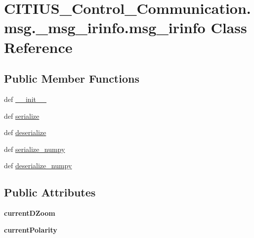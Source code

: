 \hypertarget{class_c_i_t_i_u_s___control___communication_1_1msg_1_1__msg__irinfo_1_1msg__irinfo}{\section{\-C\-I\-T\-I\-U\-S\-\_\-\-Control\-\_\-\-Communication.\-msg.\-\_\-msg\-\_\-irinfo.\-msg\-\_\-irinfo \-Class \-Reference}
\label{class_c_i_t_i_u_s___control___communication_1_1msg_1_1__msg__irinfo_1_1msg__irinfo}
}
\subsection*{\-Public \-Member \-Functions}
\begin{DoxyCompactItemize}
\item 
def \hyperlink{class_c_i_t_i_u_s___control___communication_1_1msg_1_1__msg__irinfo_1_1msg__irinfo_af01b0eb12fb7286506f283522351d9ca}{\-\_\-\-\_\-init\-\_\-\-\_\-}
\item 
def \hyperlink{class_c_i_t_i_u_s___control___communication_1_1msg_1_1__msg__irinfo_1_1msg__irinfo_ab79a7fe0af9cd3a4d92b5ab272a57dcd}{serialize}
\item 
def \hyperlink{class_c_i_t_i_u_s___control___communication_1_1msg_1_1__msg__irinfo_1_1msg__irinfo_a308f238bd77a0348050f1cf4178be9bd}{deserialize}
\item 
def \hyperlink{class_c_i_t_i_u_s___control___communication_1_1msg_1_1__msg__irinfo_1_1msg__irinfo_a437763941565adef687fab3cf0d41b72}{serialize\-\_\-numpy}
\item 
def \hyperlink{class_c_i_t_i_u_s___control___communication_1_1msg_1_1__msg__irinfo_1_1msg__irinfo_ae7653813b78268979670b32ce78971f3}{deserialize\-\_\-numpy}
\end{DoxyCompactItemize}
\subsection*{\-Public \-Attributes}
\begin{DoxyCompactItemize}
\item 
\hypertarget{class_c_i_t_i_u_s___control___communication_1_1msg_1_1__msg__irinfo_1_1msg__irinfo_a39f6b9fcb8096a124c8071a4c674b0ad}{{\bfseries current\-D\-Zoom}}\label{class_c_i_t_i_u_s___control___communication_1_1msg_1_1__msg__irinfo_1_1msg__irinfo_a39f6b9fcb8096a124c8071a4c674b0ad}

\item 
\hypertarget{class_c_i_t_i_u_s___control___communication_1_1msg_1_1__msg__irinfo_1_1msg__irinfo_a7f92d6f7a12503e4fb6817adb6faffa7}{{\bfseries current\-Polarity}}\label{class_c_i_t_i_u_s___control___communication_1_1msg_1_1__msg__irinfo_1_1msg__irinfo_a7f92d6f7a12503e4fb6817adb6faffa7}

\end{DoxyCompactItemize}
